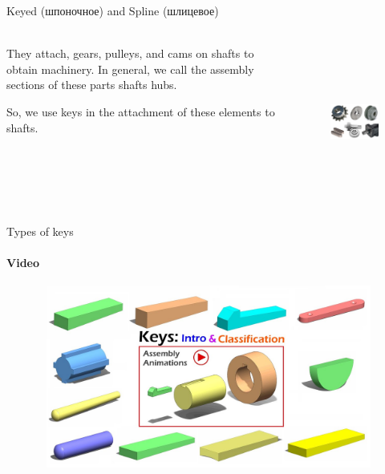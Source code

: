 \documentclass[aspectratio=169]{beamer}
\begin{document}
\begin{frame}[t]{Keyed (шпоночное) and Spline (шлицевое)}
    \framesubtitle{}
    \begin{columns}[T,onlytextwidth]
        \begin{column}{0.49\textwidth}
            They attach, gears, pulleys, and cams on shafts to obtain machinery. In general, we call the assembly sections of these parts shafts hubs.

            So, we use keys in the attachment of these elements to shafts.
        \end{column}
        \begin{column}{0.49\textwidth}
            \begin{figure}[H]
                \centering\includegraphics[height=5cm,width=1\textwidth,keepaspectratio]{find_key.png}
                \label{fig:find_key.png}
            \end{figure}
        \end{column}
    \end{columns}
\end{frame}

\begin{frame}[t]{Types of keys}
    \framesubtitle{Video}
    \vspace{-0.6cm}
    \begin{figure}[H]
        \href{https://youtu.be/F3c6GPAFZMI}{
            \centering\includegraphics[height=6cm,width=1\textwidth,keepaspectratio]{keyed_video.jpg}}
        \label{fig:keyed_video.jpg}
    \end{figure}
\end{frame}
\end{document}
